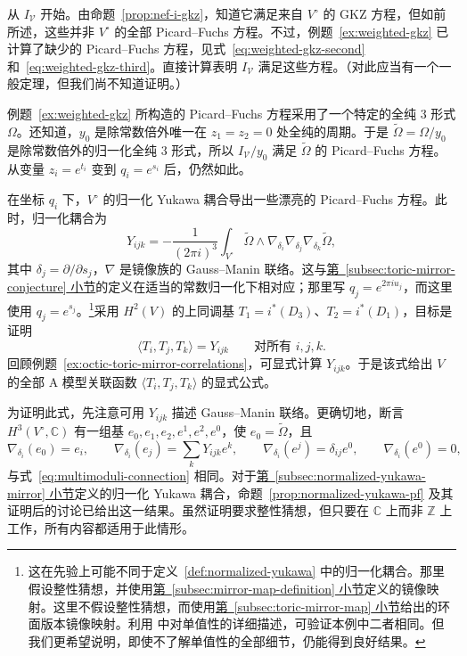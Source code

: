 \begin{example}
从 $I_{\mathcal V}$ 开始。由命题~\ref{prop:nef-i-gkz}，知道它满足来自 $V^\circ$ 的 GKZ 方程，但如前所述，这些并非 $V^\circ$ 的全部 Picard--Fuchs 方程。不过，例题~\ref{ex:weighted-gkz} 已计算了缺少的 Picard--Fuchs 方程，见式~\eqref{eq:weighted-gkz-second} 和~\eqref{eq:weighted-gkz-third}。直接计算表明 $I_{\mathcal V}$ 满足这些方程。（对此应当有一个一般定理，但我们尚不知道证明。）

例题~\ref{ex:weighted-gkz} 所构造的 Picard--Fuchs 方程采用了一个特定的全纯 $3$ 形式 $\Omega$。还知道，$y_0$ 是除常数倍外唯一在 $z_1=z_2=0$ 处全纯的周期。于是 $\widetilde\Omega=\Omega/y_0$ 是除常数倍外的归一化全纯 $3$ 形式，所以 $I_{\mathcal V}/y_0$ 满足 $\widetilde\Omega$ 的 Picard--Fuchs 方程。从变量 $z_i=e^{t_i}$ 变到 $q_i=e^{s_i}$ 后，仍然如此。

在坐标 $q_i$ 下，$V^\circ$ 的归一化 Yukawa 耦合导出一些漂亮的 Picard--Fuchs 方程。此时，归一化耦合为
\[
Y_{ijk}=-\frac1{(2\pi i)^3}\int_{V^\circ}\widetilde\Omega\wedge\nabla_{\delta_i}\nabla_{\delta_j}\nabla_{\delta_k}\widetilde\Omega,
\]
其中 $\delta_j=\partial/\partial s_j$，$\nabla$ 是镜像族的 Gauss--Manin 联络。这与\hyperref[subsec:toric-mirror-conjecture]{第~\ref*{subsec:toric-mirror-conjecture} 小节}的定义在适当的常数归一化下相对应；那里写 $q_j=e^{2\pi iu_j}$，而这里使用 $q_j=e^{s_j}$。\footnote{这在先验上可能不同于定义~\ref{def:normalized-yukawa} 中的归一化耦合。那里假设整性猜想，并使用\hyperref[subsec:mirror-map-definition]{第~\ref*{subsec:mirror-map-definition} 小节}定义的镜像映射。这里不假设整性猜想，而使用\hyperref[subsec:toric-mirror-map]{第~\ref*{subsec:toric-mirror-map} 小节}给出的环面版本镜像映射。利用  中对单值性的详细描述，可验证本例中二者相同。但我们更希望说明，即使不了解单值性的全部细节，仍能得到良好结果。}采用 $H^2(V)$ 的上同调基 $T_1=i^*(D_3)$、$T_2=i^*(D_1)$，目标是证明
\begin{equation}\label{eq:octic-toric-mirror-correlation-equality}
\langle T_i,T_j,T_k\rangle=Y_{ijk}\qquad\text{对所有 }i,j,k.
\end{equation}
回顾例题~\ref{ex:octic-toric-mirror-correlations}，可显式计算 $Y_{ijk}$。于是该式给出 $V$ 的全部 A 模型关联函数 $\langle T_i,T_j,T_k\rangle$ 的显式公式。

为证明此式，先注意可用 $Y_{ijk}$ 描述 Gauss--Manin 联络。更确切地，断言 $H^3(V^\circ,\mathbb C)$ 有一组基 $e_0,e_1,e_2,e^1,e^2,e^0$，使 $e_0=\widetilde\Omega$，且
\[
\nabla_{\delta_i}(e_0)=e_i,\qquad\nabla_{\delta_i}(e_j)=\sum_kY_{ijk}e^k,\qquad
\nabla_{\delta_i}(e^j)=\delta_{ij}e^0,\qquad\nabla_{\delta_i}(e^0)=0,
\]
与式~\eqref{eq:multimoduli-connection} 相同。对于\hyperref[subsec:normalized-yukawa-mirror]{第~\ref*{subsec:normalized-yukawa-mirror} 小节}定义的归一化 Yukawa 耦合，命题~\ref{prop:normalized-yukawa-pf} 及其证明后的讨论已给出这一结果。虽然证明要求整性猜想，但只要在 $\mathbb C$ 上而非 $\mathbb Z$ 上工作，所有内容都适用于此情形。


\end{example}
